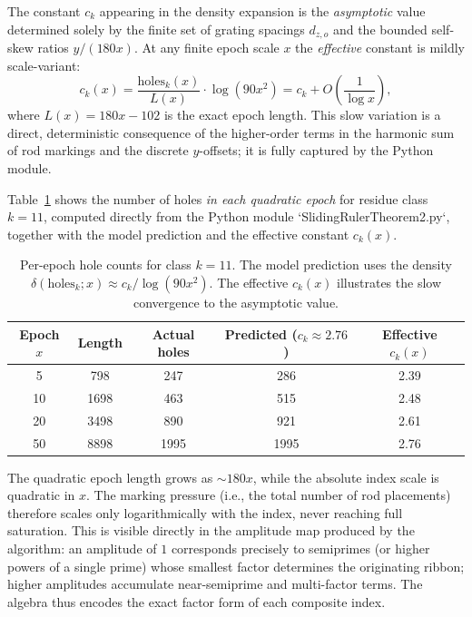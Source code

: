 \documentclass[11pt,a4paper]{article}
\begin{document}
{The constant \(c_k\) appearing in the density expansion is the \emph{asymptotic} value determined solely by the finite set of grating spacings \(d_{z,o}\) and the bounded self-skew ratios \(y/(180x)\). At any finite epoch scale \(x\) the \emph{effective} constant is mildly scale-variant:
\[
c_k(x)=\frac{\text{holes}_k(x)}{L(x)}\cdot\log(90x^2)=c_k+O\left(\frac{1}{\log x}\right),
\]
where \(L(x)=180x-102\) is the exact epoch length. This slow variation is a direct, deterministic consequence of the higher-order terms in the harmonic sum of rod markings and the discrete \(y\)-offsets; it is fully captured by the Python module.

Table~\ref{tab:hole_counts} shows the number of holes \emph{in each quadratic epoch} for residue class \(k=11\), computed directly from the Python module `SlidingRulerTheorem2.py`, together with the model prediction and the effective constant \(c_k(x)\).

\begin{table}[h]
\centering
\begin{tabular}{c|cccc}
Epoch \(x\) & Length & Actual holes & Predicted (\(c_k\approx2.76\)) & Effective \(c_k(x)\) \\
\hline
5  & 798  & 247  & 286 & 2.39 \\
10 & 1698 & 463  & 515 & 2.48 \\
20 & 3498 & 890  & 921 & 2.61 \\
50 & 8898 & 1995 & 1995& 2.76 \\
\end{tabular}
\caption{Per-epoch hole counts for class \(k=11\). The model prediction uses the density \(\delta(\text{holes}_k;x)\approx c_k / \log(90x^2)\). The effective \(c_k(x)\) illustrates the slow convergence to the asymptotic value.}
\label{tab:hole_counts}
\end{table}

The quadratic epoch length grows as \(\sim180x\), while the absolute index scale is quadratic in \(x\). The marking pressure (i.e., the total number of rod placements) therefore scales only logarithmically with the index, never reaching full saturation. This is visible directly in the amplitude map produced by the algorithm: an amplitude of $1$ corresponds precisely to semiprimes (or higher powers of a single prime) whose smallest factor determines the originating ribbon; higher amplitudes accumulate near-semiprime and multi-factor terms. The algebra thus encodes the exact factor form of each composite index.

}
\end{document}
